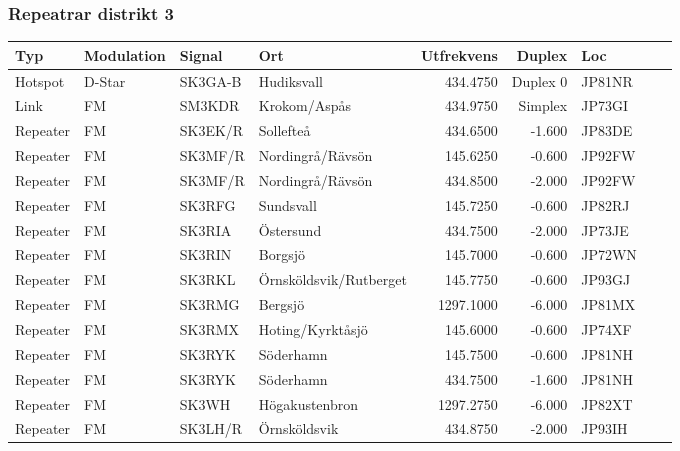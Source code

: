 \subsubsection{Repeatrar distrikt 3}

\begin{longtable}{llllrrlcl}
	Typ      & Modulation      & Signal   & Ort                    & Utfrekvens &   Duplex & Loc    &  &  \\ \hline
	Hotspot  & D-Star          & SK3GA-B  & Hudiksvall             &   434.4750 & Duplex 0 & JP81NR &  &  \\
	Link     & FM              & SM3KDR   & Krokom/Aspås           &   434.9750 &  Simplex & JP73GI &  &  \\
	Repeater & FM              & SK3EK/R  & Sollefteå              &   434.6500 &   -1.600 & JP83DE &  &  \\
	Repeater & FM              & SK3MF/R  & Nordingrå/Rävsön       &   145.6250 &   -0.600 & JP92FW &  &  \\
	Repeater & FM              & SK3MF/R  & Nordingrå/Rävsön       &   434.8500 &   -2.000 & JP92FW &  &  \\
	Repeater & FM              & SK3RFG   & Sundsvall              &   145.7250 &   -0.600 & JP82RJ &  &  \\
	Repeater & FM              & SK3RIA   & Östersund              &   434.7500 &   -2.000 & JP73JE &  &  \\
	Repeater & FM              & SK3RIN   & Borgsjö                &   145.7000 &   -0.600 & JP72WN &  &  \\
	Repeater & FM              & SK3RKL   & Örnsköldsvik/Rutberget &   145.7750 &   -0.600 & JP93GJ &  &  \\
	Repeater & FM              & SK3RMG   & Bergsjö                &  1297.1000 &   -6.000 & JP81MX &  &  \\
	Repeater & FM              & SK3RMX   & Hoting/Kyrktåsjö       &   145.6000 &   -0.600 & JP74XF &  &  \\
	Repeater & FM              & SK3RYK   & Söderhamn              &   145.7500 &   -0.600 & JP81NH &  &  \\
	Repeater & FM              & SK3RYK   & Söderhamn              &   434.7500 &   -1.600 & JP81NH &  &  \\
	Repeater & FM              & SK3WH    & Högakustenbron         &  1297.2750 &   -6.000 & JP82XT &  &  \\
	Repeater & FM              & SK3LH/R  & Örnsköldsvik           &   434.8750 &   -2.000 & JP93IH &  &  \\

\end{longtable}
